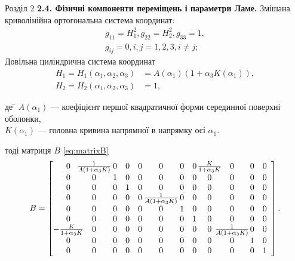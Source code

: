 \documentclass[8pt]{beamer}
\numberwithin{figure}{section}
\numberwithin{equation}{section}
\numberwithin{table}{section}
\begin{document}
\begin{frame}{Розділ 2}
\textbf{2.4. Фізичні компоненти переміщень і параметри Ламе.}
\linebreak
\linebreak
Змішана криволінійна ортогональна система координат:
\begin{gather}
g_{11}=H_1^2, g_{22}=H_2^2, g_{33}=1, \\
g_{ij}=0, i,j=1,2,3, i \ne j;
\end{gather}
Довільна циліндрична система координат
\begin{align}
H_1 = H_1 \left( \alpha_1, \alpha_2, \alpha_3 \right) &= A \left( \alpha_1 \right) \left( 1+ \alpha_3 K \left( \alpha_1 \right) \right),  \\
H_2 = H_2 \left( \alpha_1, \alpha_2, \alpha_3 \right) &= 1,
\end{align}

\begin{tabbing}
де \= $  A \left( \alpha_1 \right)$ --- коефіцієнт першої квадратичної форми серединної поверхні оболонки,\\
\> $K \left( \alpha_1 \right)$ --- головна кривина напрямної в напрямку осі $\alpha_1$.
\end{tabbing}
тоді матриця $B$ \eqref{eq:matrixB}
\begin{equation}
B=
\left[\begin{array}{@{}c@{\hspace{-8pt}}c@{\hspace{2pt}}ccc@{\hspace{2pt}}c@{\hspace{2pt}}cc@{\hspace{1pt}}c@{\hspace{-8pt}}c@{\hspace{1pt}}cc}
0 & \frac{1}{A \left(1+ \alpha_{3} K \right)} & 0 & 0 & 0 & 0 & 0 & 0 & \frac{K}{1+ \alpha_{3} K } & 0 & 0 & 0\\0 & 0 & 1 & 0 & 0 & 0 & 0 & 0 & 0 & 0 & 0 & 0\\0 & 0 & 0 & 1 & 0 & 0 & 0 & 0 & 0 & 0 & 0 & 0\\0 & 0 & 0 & 0 & 0 & \frac{1}{A \left(1+ \alpha_{3} K \right)} & 0 & 0 & 0 & 0 & 0 & 0\\0 & 0 & 0 & 0 & 0 & 0 & 1 & 0 & 0 & 0 & 0 & 0\\0 & 0 & 0 & 0 & 0 & 0 & 0 & 1 & 0 & 0 & 0 & 0\\- \frac{K}{1+ \alpha_{3} K } & 0 & 0 & 0 & 0 & 0 & 0 & 0 & 0 & \frac{1}{A \left(1+ \alpha_{3} K \right)} & 0 & 0\\0 & 0 & 0 & 0 & 0 & 0 & 0 & 0 & 0 & 0 & 1 & 0\\0 & 0 & 0 & 0 & 0 & 0 & 0 & 0 & 0 & 0 & 0 & 1\end{array}\right].
\end{equation}

\end{frame}
\end{document}
